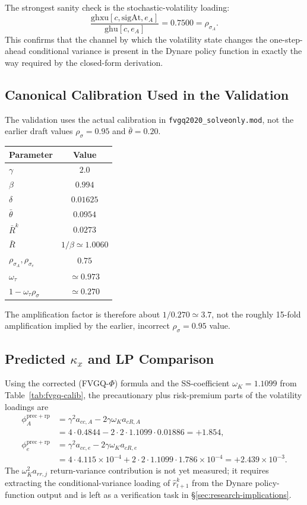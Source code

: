 \documentclass[11pt]{article}
\theoremstyle{plain}
\theoremstyle{definition}
\begin{document}
The strongest sanity check is the stochastic-volatility loading:
\[
\frac{\mathrm{ghxu}[c,\mathrm{sigAt},e_A]}{\mathrm{ghu}[c,e_A]}
=0.7500=\rho_{\sigma_A}.
\]
This confirms that the channel by which the volatility state changes the
one-step-ahead conditional variance is present in the Dynare policy function in
exactly the way required by the closed-form derivation.

\subsection{Canonical Calibration Used in the Validation}

The validation uses the actual calibration in
\texttt{fvgq2020\_solveonly.mod}, not the earlier draft values
$\rho_\sigma=0.95$ and $\bar\theta=0.20$.

\begin{center}
\begin{tabular}{lc}
\toprule
Parameter & Value \\
\midrule
$\gamma$ & $2.0$ \\
$\beta$ & $0.994$ \\
$\delta$ & $0.01625$ \\
$\bar\theta$ & $0.0954$ \\
$\bar R^k$ & $0.0273$ \\
$\bar R$ & $1/\beta\simeq 1.0060$ \\
$\rho_{\sigma_A},\rho_{\sigma_e}$ & $0.75$ \\
$\omega_\tau$ & $\simeq 0.973$ \\
$1-\omega_\tau\rho_\sigma$ & $\simeq 0.270$ \\
\bottomrule
\end{tabular}
\end{center}

The amplification factor is therefore about $1/0.270\simeq 3.7$, not the
roughly 15-fold amplification implied by the earlier, incorrect
$\rho_\sigma=0.95$ value.

\subsection{Predicted \texorpdfstring{$\kappa_x$}{kappa} and LP Comparison}

Using the corrected (FVGQ-$\Phi$) formula and the SS-coefficient
$\omega_K=1.1099$ from Table~\ref{tab:fvgq-calib}, the precautionary plus
risk-premium parts of the volatility loadings are
\begin{align*}
\phi_A^{\mathrm{prec+rp}}
&= \gamma^2 a_{cc,A} - 2\gamma\omega_K a_{cR,A}\\
&= 4\cdot 0.4844 - 2\cdot 2 \cdot 1.1099\cdot 0.01886
= +1.854,\\
\phi_e^{\mathrm{prec+rp}}
&= \gamma^2 a_{cc,e} - 2\gamma\omega_K a_{cR,e}\\
&= 4\cdot 4.115\times 10^{-4}
+ 2\cdot 2\cdot 1.1099\cdot 1.786\times 10^{-4}
= +2.439\times 10^{-3}.
\end{align*}
The $\omega_K^2 a_{rr,j}$ return-variance contribution is not yet measured;
it requires extracting the conditional-variance loading of $\hat r^k_{t+1}$
from the Dynare policy-function output and is left as a verification task in
§\ref{sec:research-implications}.
\end{document}
